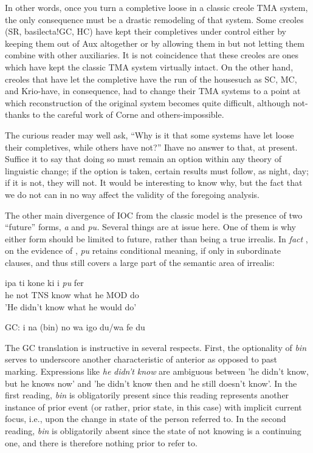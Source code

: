 In other words, once you turn a completive loose in a classic creole TMA system, the only consequence must be a drastic remodeling of that system. Some creoles (SR, basilecta!GC, HC) have kept their completives under control either by keeping them out of Aux al\-together or by allowing them in but not letting them combine with other auxiliaries. It is not coincidence that these creoles are ones which have kept the classic TMA system virtually intact. On the other hand, creoles that have let the completive have the run of the house\-such as SC, MC, and Krio-have, in consequence, had to change their TMA systems to a point at which reconstruction of the original system becomes quite difficult, although not-thanks to the careful work of Corne and others-impossible.

The curious reader may well ask, ``Why is it that some systems
have let loose their completives, while others have not?'' Ihave no answer to that, at present. Suffice it to say that doing so must remain an option within any theory of linguistic change; if the option is taken, certain results must follow, as night, day; if it is not, they will not. It would be interesting to know why, but the fact that we do not can in no way affect the validity of the foregoing analysis.


The other main divergence of IOC from the classic model is the presence of two ``future'' forms, \textit{a} and \textit{pu.} Several things are at issue here. One of them is why either form should be limited to future, rather than being a true irrealis. In \textit{fact} , on the evidence of \citet[103]{Corne1977}, \textit{pu} retains conditional meaning, if only in subordinate clauses, and thus still covers a large part of the semantic area of ir\-realis:


\ea\label{ex:118}
\gll ipa ti kone ki i \textit{pu} fer\\
he not TNS know what he MOD do \\
\glt 'He didn't know what he would do'
\z

\ea\label{ex:119}
 GC: i na (bin) no wa igo du/wa fe du
\z

The GC translation is instructive in several respects. First, the optionality of \textit{bin} serves to underscore another characteristic of ante\-rior as opposed to past marking. Expressions like \textit{he} \textit{didn't} \textit{know} are ambiguous between 'he didn't know, but he knows now' and 'he didn't know then and he still doesn't know'. In the first reading, \textit{bin} is obli\-gatorily present since this reading represents another instance of prior event (or rather, prior state, in this case) with implicit current focus, i.e., upon the change in state of the person referred to. In the second reading, \textit{bin} is obligatorily absent since the state of not knowing is a continuing one, and there is therefore nothing prior to refer to.

